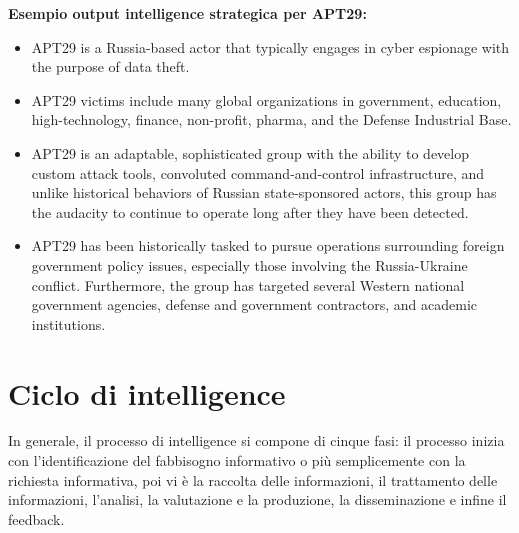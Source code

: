 \begin{center}
    \noindent\textbf{Esempio output intelligence strategica per APT29:}\newline\newline
    \begin{varwidth}{\textwidth}
        \begin{itemize}
            \item APT29 is a Russia-based actor that typically engages in cyber espionage with the purpose of data theft.
            \item APT29 victims include many global organizations in government, education, high-technology, finance, non-profit, pharma, and the Defense Industrial Base.
            \item APT29 is an adaptable, sophisticated group with the ability to develop custom attack tools, convoluted command-and-control infrastructure, and unlike historical behaviors of Russian state-sponsored actors, this group has the audacity to continue to operate long after they have been detected.
            \item APT29 has been historically tasked to pursue operations surrounding foreign government policy issues, especially those involving the Russia-Ukraine conflict. Furthermore, the group has targeted several Western national government agencies, defense and government contractors, and academic institutions.
        \end{itemize}
    \end{varwidth}
\end{center}

\newpage

\section{Ciclo di intelligence}
\label{sec:Ciclo di intelligence}

In generale, il processo di intelligence si compone di cinque fasi: il processo inizia con l’identificazione del fabbisogno informativo o più semplicemente con la richiesta informativa, poi vi è la raccolta delle informazioni, il trattamento delle informazioni, l’analisi, la valutazione e la produzione, la disseminazione e infine il feedback.

